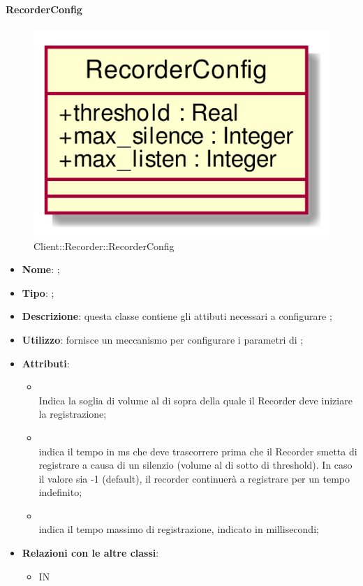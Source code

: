 \hypertarget{RecorderConfig_label}{\paragraph{RecorderConfig}}
\begin{figure}[h]
	\centering
	\includegraphics[width=\textwidth,height=\textheight,keepaspectratio]{images/ClassRecorderConfig.png}
	\caption{Client::Recorder::RecorderConfig}
\end{figure}
\begin{itemize}
	\item \textbf{Nome}: ;
	\item \textbf{Tipo}: ;
	\item \textbf{Descrizione}: questa classe contiene gli attibuti necessari a configurare ;
	\item \textbf{Utilizzo}: fornisce un meccanismo per configurare i parametri di ;
	\item \textbf{Attributi}:
	\begin{itemize}
		\item[]  \\
		Indica la soglia di volume al di sopra della quale il Recorder deve iniziare la registrazione;
		\item[]  \\
		indica il tempo in ms che deve trascorrere prima che il Recorder smetta di registrare a causa di un silenzio (volume al di sotto di threshold). In caso il valore sia -1 (default), il recorder continuerà a registrare per un tempo indefinito;
		\item[]  \\
		indica il tempo massimo di registrazione, indicato in millisecondi;
	\end{itemize}
	\item \textbf{Relazioni con le altre classi}:
	\begin{itemize}
		\item IN \hyperlink{Recorder_label}{}
	\end{itemize}
\end{itemize}
\FloatBarrier

